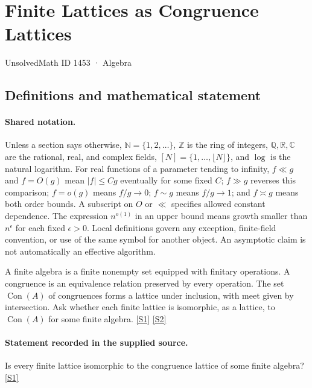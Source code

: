 \documentclass[11pt,a4paper]{article}
\newcommand{\N}{\mathbb{N}}
\newcommand{\Z}{\mathbb{Z}}
\newcommand{\Q}{\mathbb{Q}}
\newcommand{\R}{\mathbb{R}}
\newcommand{\C}{\mathbb{C}}
\newcommand{\sref}[2]{\hyperlink{source:#1:#2}{[S#2]}}
\begin{document}

\setcounter{section}{1452}

\section{Finite Lattices as Congruence Lattices}\label{1453}

{\small\sffamily UnsolvedMath ID 1453 · Algebra}

\subsection{Definitions and mathematical statement}

\paragraph{Shared notation.}Unless a section says otherwise, $\N=\{1,2,\ldots\}$,
$\Z$ is the ring of integers, $\Q,\R,\C$ are the rational, real, and complex
fields, $[N]=\{1,\ldots,\lfloor N\rfloor\}$, and $\log$ is the natural
logarithm. For real functions of a parameter tending to infinity,
$f\ll g$ and $f=O(g)$ mean $|f|\leq Cg$ eventually for some fixed $C$;
$f\gg g$ reverses this comparison; $f=o(g)$ means $f/g\to0$;
$f\sim g$ means $f/g\to1$; and $f\asymp g$ means both order bounds.
A subscript on $O$ or $\ll$ specifies allowed constant dependence.
The expression $n^{o(1)}$ in an upper bound means growth smaller than
$n^\epsilon$ for each fixed $\epsilon>0$. Local definitions govern any
exception, finite-field convention, or use of the same symbol for another
object. An asymptotic claim is not automatically an effective algorithm.



A finite algebra is a finite nonempty set equipped with finitary operations. A congruence is an equivalence relation preserved by every operation. The set $\operatorname{Con}(A)$ of congruences forms a lattice under inclusion, with meet given by intersection. Ask whether each finite lattice is isomorphic, as a lattice, to $\operatorname{Con}(A)$ for some finite algebra. \sref{1453}{1} \sref{1453}{2}

\paragraph{Statement recorded in the supplied source.}
Is every finite lattice isomorphic to the congruence lattice of some finite algebra? \sref{1453}{1}
\end{document}
